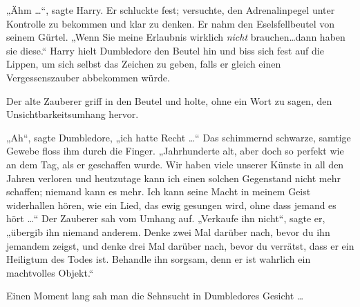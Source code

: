 „Ähm …“, sagte Harry. Er schluckte fest; versuchte, den Adrenalinpegel unter Kontrolle zu bekommen und klar zu denken. Er nahm den Eselsfellbeutel von seinem Gürtel. „Wenn Sie meine Erlaubnis wirklich \emph{nicht} brauchen…dann haben sie diese.“ Harry hielt Dumbledore den Beutel hin und biss sich fest auf die Lippen, um sich selbst das Zeichen zu geben, falls er gleich einen Vergessenszauber abbekommen würde.

Der alte Zauberer griff in den Beutel und holte, ohne ein Wort zu sagen, den Unsichtbarkeitsumhang hervor.

„Ah“, sagte Dumbledore, „ich hatte Recht …“ Das schimmernd schwarze, samtige Gewebe floss ihm durch die Finger. „Jahrhunderte alt, aber doch so perfekt wie an dem Tag, als er geschaffen wurde. Wir haben viele unserer Künste in all den Jahren verloren und heutzutage kann ich einen solchen Gegenstand nicht mehr schaffen; niemand kann es mehr. Ich kann seine Macht in meinem Geist widerhallen hören, wie ein Lied, das ewig gesungen wird, ohne dass jemand es hört …“ Der Zauberer sah vom Umhang auf. „Verkaufe ihn nicht“, sagte er, „übergib ihn niemand anderem. Denke zwei Mal darüber nach, bevor du ihn jemandem zeigst, und denke drei Mal darüber nach, bevor du verrätst, dass er ein Heiligtum des Todes ist. Behandle ihn sorgsam, denn er ist wahrlich ein machtvolles Objekt.“

Einen Moment lang sah man die Sehnsucht in Dumbledores Gesicht …

